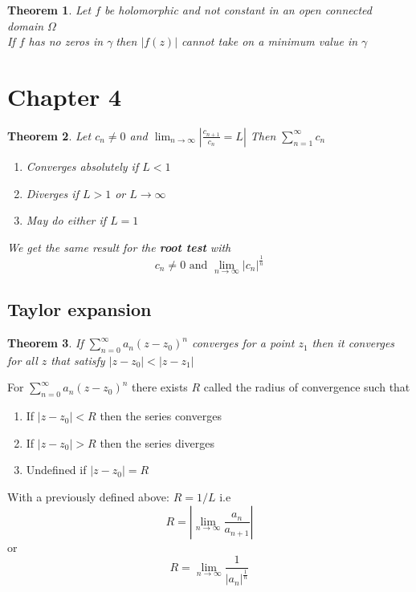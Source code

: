 \documentclass{article}
\newtheorem{theorem}{Theorem}[section]
\newenvironment{definition}[1][Definition]{\begin{trivlist}
\item[\hskip \labelsep {\bfseries #1}]}{\end{trivlist}}
\newcommand{\OO}{$ \Omega \;$}
\newcommand{\GG}{$ \gamma \;$}
\newcommand{\SumI}{\sum_{n = 0}^\infty}
\begin{document}
\begin{theorem}
    Let $f$ be holomorphic and not constant in an open connected domain \OO\\
    If $f$ has no zeros in \GG then $|f(z)|$ cannot take on a minimum value in \GG
\end{theorem}


\section*{Chapter 4} %
\setcounter{section}{4}
\begin{theorem}
    Let \(c_n \neq 0\) and \(\lim_{n \rightarrow \infty} \left| \frac{c_{n+1}}{c_n} = L \right|\)
    Then \(\sum_{n = 1}^\infty c_n\)
    \begin{enumerate}
        \item Converges absolutely if $L < 1$
        \item Diverges if $L > 1$  or $L \rightarrow \infty$
        \item May do either if $L = 1$
    \end{enumerate}
    We get the same result for the \textbf{root test} with
    \[c_n \neq 0 \text{ and } \lim_{n \rightarrow \infty} \left| c_n\right|^{\frac{1}{n}} \]
\end{theorem}


\subsection*{Taylor expansion}
\begin{theorem}
    If \(\SumI a_n(z-z_0)^n\) converges for a point $z_1$ then it converges for
    all $z$ that satisfy $|z-z_0| < |z-z_1|$
\end{theorem}

\begin{definition}
    For $\SumI a_n(z-z_0)^n$ there exists $R$ called the radius of convergence such that
    \begin{enumerate}
        \item If $|z-z_0| < R$ then the series converges
        \item If $|z-z_0| > R$ then the series diverges
        \item Undefined if $|z-z_0| = R$
    \end{enumerate}
    With a previously defined above: $R = 1/L$ i.e
    \[R = \left| \lim_{n \rightarrow \infty} \frac{a_n}{a_{n+1}}\right|\]
    or 
    \[R =  \lim_{n \rightarrow \infty} \frac{1}{|a_n|^{\frac{1}{n}}}\]
\end{definition}
\end{document}
